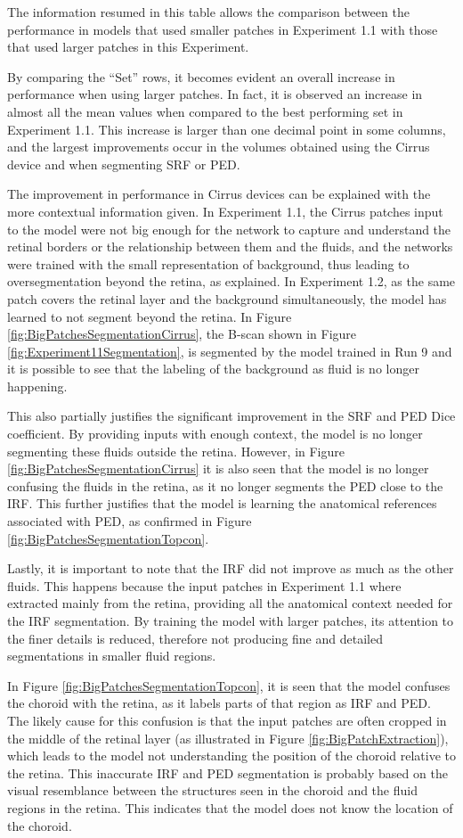 The information resumed in this table allows the comparison between the performance in models that used smaller patches in Experiment 1.1 with those that used larger patches in this Experiment.
\par
By comparing the ``Set'' rows, it becomes evident an overall increase in performance when using larger patches. In fact, it is observed an increase in almost all the mean values when compared to the best performing set in Experiment 1.1. This increase is larger than one decimal point in some columns, and the largest improvements occur in the volumes obtained using the Cirrus device and when segmenting SRF or PED.
\par
The improvement in performance in Cirrus devices can be explained with the more contextual information given. In Experiment 1.1, the Cirrus patches input to the model were not big enough for the network to capture and understand the retinal borders or the relationship between them and the fluids, and the networks were trained with the small representation of background, thus leading to oversegmentation beyond the retina, as explained. In Experiment 1.2, as the same patch covers the retinal layer and the background simultaneously, the model has learned to not segment beyond the retina. In Figure \ref{fig:BigPatchesSegmentationCirrus}, the B-scan shown in Figure \ref{fig:Experiment11Segmentation}, is segmented by the model trained in Run 9 and it is possible to see that the labeling of the background as fluid is no longer happening.
\par 
This also partially justifies the significant improvement in the SRF and PED Dice coefficient. By providing inputs with enough context, the model is no longer segmenting these fluids outside the retina. However, in Figure \ref{fig:BigPatchesSegmentationCirrus} it is also seen that the model is no longer confusing the fluids in the retina, as it no longer segments the PED close to the IRF. This further justifies that the model is learning the anatomical references associated with PED, as confirmed in Figure \ref{fig:BigPatchesSegmentationTopcon}.
\par
Lastly, it is important to note that the IRF did not improve as much as the other fluids. This happens because the input patches in Experiment 1.1 where extracted mainly from the retina, providing all the anatomical context needed for the IRF segmentation. By training the model with larger patches, its attention to the finer details is reduced, therefore not producing fine and detailed segmentations in smaller fluid regions.
\par
In Figure \ref{fig:BigPatchesSegmentationTopcon}, it is seen that the model confuses the choroid with the retina, as it labels parts of that region as IRF and PED. The likely cause for this confusion is that the input patches are often cropped in the middle of the retinal layer (as illustrated in Figure \ref{fig:BigPatchExtraction}), which leads to the model not understanding the position of the choroid relative to the retina. This inaccurate IRF and PED segmentation is probably based on the visual resemblance between the structures seen in the choroid and the fluid regions in the retina. This indicates that the model does not know the location of the choroid.

